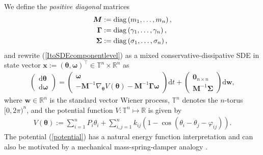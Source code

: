 \documentclass[10pt,twocolumn]{IEEEtran}
\begin{document}
We define the \emph{positive diagonal} matrices
\begin{align*}
\bm{M} &:= {\rm{diag}}\left(m_{1},\hdots,m_{n}\right), \nonumber\\
\bm{\Gamma} &:= {\rm{diag}}\left(\gamma_{1},\hdots,\gamma_{n}\right),\nonumber\\
\bm{\Sigma} &:= {\rm{diag}}\left(\sigma_{1},\hdots,\sigma_{n}\right),
\end{align*}
and rewrite (\ref{ItoSDEcomponentlevel}) as a mixed conservative-dissipative SDE in state vector $\bm{x} := (\bm{\theta},\bm{\omega})^{\top} \in \mathbb{T}^{n} \times \mathbb{R}^{n}$ as
\begin{align}
\begin{pmatrix}
{\mathrm{d}}\bm{\theta}\\
{\mathrm{d}}\bm{\omega}	
\end{pmatrix}
\! = \!\begin{pmatrix}
\bm{\omega}\\
-\bm{M}^{-1}\nabla_{\bm{\theta}}V(\bm{\theta}) -\bm{M}^{-1}\bm{\Gamma}\bm{\omega}  	
\end{pmatrix}{\mathrm{d}}t + \!\begin{pmatrix}
 \bm{0}_{n\times n}\\
 \bm{M}^{-1}\bm{\Sigma}	
 \end{pmatrix}{\mathrm{d}}\bm{w},
\label{ItoSDEvectorlevel}
\end{align}
where 
$\bm{w}\in\mathbb{R}^{n}$ is the standard vector Wiener process, $\mathbb{T}^{n}$ denotes the $n$-torus $[0,2\pi)^{n}$, and the potential function $V : \mathbb{T}^{n} \mapsto \mathbb{R}$ is given by
\begin{align}
V(\bm{\theta}) := \displaystyle\sum_{i=1}^{n} P_{i}\theta_{i} + \!\displaystyle\sum_{i,j=1}^{n}\!k_{ij}\left(1 - \cos(\theta_{i}-\theta_{j}-\varphi_{ij})\right).
\label{potential}	
\end{align}
The potential (\ref{potential}) has a natural energy function interpretation and can also be motivated by a mechanical mass-spring-damper analogy \cite{dorfler2013synchronization,ishizaki2018}. %
\end{document}
